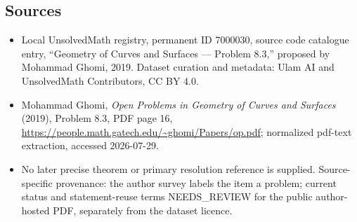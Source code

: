 \documentclass[11pt]{article}
\begin{document}
\subsection{Sources}
\begin{itemize}
\item Local UnsolvedMath registry, permanent ID 7000030, source code catalogue entry, ``Geometry of Curves and Surfaces --- Problem 8.3,'' proposed by Mohammad Ghomi, 2019. Dataset curation and metadata: Ulam AI and UnsolvedMath Contributors, CC BY 4.0.
\item Mohammad Ghomi, \emph{Open Problems in Geometry of Curves and Surfaces} (2019), Problem 8.3, PDF page 16, \url{https://people.math.gatech.edu/~ghomi/Papers/op.pdf}; normalized pdf-text extraction, accessed 2026-07-29.
\item No later precise theorem or primary resolution reference is supplied. Source-specific provenance: the author survey labels the item a problem; current status and statement-reuse terms NEEDS\_REVIEW for the public author-hosted PDF, separately from the dataset licence.
\end{itemize}
\end{document}
